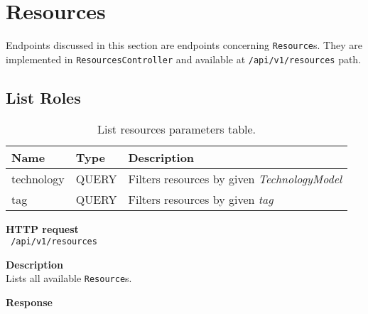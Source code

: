 \section{Resources}
Endpoints discussed in this section are endpoints concerning \texttt{Resource}s.
They are implemented in \texttt{ResourcesController} and available at \texttt{/api/v1/resources} path.

\subsection{List Roles}
\begin{table}[ht!]
    \begin{tabularx}{\textwidth}{llX}
        \toprule
        Name & Type & Description \\
        \midrule
        technology & QUERY & Filters resources by given \emph{TechnologyModel} \\  
        tag & QUERY & Filters resources by given \emph{tag}
        \end{tabularx}
    \caption{List resources parameters table.}
\end{table}
\begin{description}
    \item \textbf{HTTP request}\\
        \texttt{\text{[GET]} /api/v1/resources}
    \item \textbf{Description}\\
        Lists all available \texttt{Resource}s.
    \item \textbf{Response}\\
        \texttt{\text{[200 OK]} \text{[ResourceModel]}}
\end{description}
